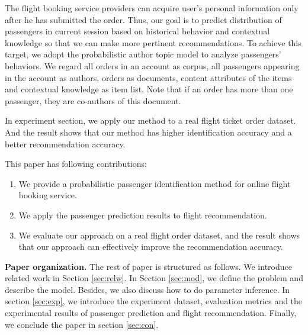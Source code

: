 \documentclass{llncs}
\begin{document}
 The flight booking service providers can acquire user's personal information only after he has submitted the order. Thus, our goal is to predict distribution of passengers in current session based on historical behavior and contextual knowledge so that we can make more pertinent recommendations. To achieve this target, we adopt the probabilistic author topic model to analyze passengers' behaviors. We regard all orders in an account as corpus, all passengers appearing in the account as authors, orders as documents, content attributes of the items and contextual knowledge as item list. Note that if an order has more than one passenger, they are co-authors of this document.\par
 In experiment section, we apply our method to a real flight ticket order dataset.  And the result shows that our method has higher identification accuracy and a better recommendation accuracy.\par
 This paper has following contributions:\\
\begin{enumerate}
\item We provide a probabilistic passenger identification method for online flight booking service.
\item We apply the passenger prediction results to flight recommendation.
\item We evaluate our approach on a real flight order dataset, and the result shows that our approach can effectively improve the recommendation accuracy.
\end{enumerate}

\textbf{Paper organization.} The rest of paper is structured as follows. We introduce related work in Section \ref{sec:relw}. In Section \ref{sec:mod}, we define the problem and describe the model. Besides, we also discuss how to do parameter inference. In section \ref{sec:exp}, we introduce the experiment dataset, evaluation metrics and the experimental results of passenger prediction and flight recommendation. Finally, we conclude the paper in section \ref{sec:con}.
\end{document}
